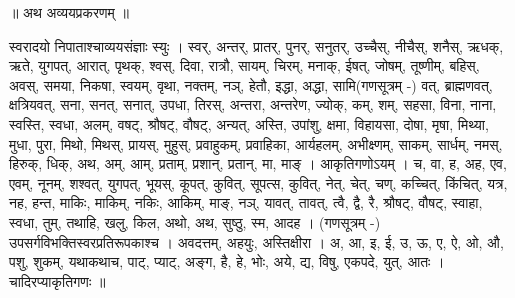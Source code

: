 ॥ अथ अव्ययप्रकरणम्‌ ॥

स्वरादयो निपाताश्चाव्ययसंज्ञाः स्युः । स्वर्, अन्तर्, प्रातर्, पुनर्,
सनुतर्, उच्चैस्, नीचैस्, शनैस्, ऋधक्, ऋते, युगपत्, आरात्, पृथक्, श्वस्,
दिवा, रात्रौ, सायम्, चिरम्, मनाक्, ईषत्, जोषम्, तूष्णीम्, बहिस्, अवस्,
समया, निकषा, स्वयम्, वृथा, नक्तम्, नञ्, हेतौ, इद्धा, अद्धा,
सामि(गणसूत्रम् -) वत्, ब्राह्मणवत्, क्षत्रियवत्, सना, सनत्, सनात्, उपधा,
तिरस्, अन्तरा, अन्तरेण, ज्योक्, कम्, शम्, सहसा, विना, नाना, स्वस्ति,
स्वधा, अलम्, वषट्, श्रौषट्, वौषट्, अन्यत्, अस्ति, उपांशु, क्षमा,
विहायसा, दोषा, मृषा, मिथ्या, मुधा, पुरा, मिथो, मिथस्, प्रायस्, मुहुस्,
प्रवाहुकम्, प्रवाहिका, आर्यहलम्, अभीक्ष्णम्, साकम्, सार्धम्, नमस्,
हिरुक्, धिक्, अथ, अम्, आम्, प्रताम्, प्रशान्, प्रतान्, मा, माङ् ।
आकृतिगणोऽयम् । च, वा, ह, अह, एव, एवम्, नूनम्, शश्वत्, युगपत्, भूयस्,
कूपत्, कुवित्, सूपत्स, कुवित्, नेत्, चेत्, चण्, कच्चित्, किंचित्, यत्र,
नह, हन्त, माकिः, माकिम्, नकिः, आकिम्, माङ्, नञ्, यावत्, तावत्, त्वै,
द्वै, रै, श्रौषट्, वौषट्, स्वाहा, स्वधा, तुम्, तथाहि, खलु, किल, अथो, अथ,
सुष्ठु, स्म, आदह । (गणसूत्रम् -) उपसर्गविभक्तिस्वरप्रतिरूपकाश्च ।
अवदत्तम्, अहयुः, अस्तिक्षीरा । अ, आ, इ, ई, उ, ऊ, ए, ऐ, ओ, औ, पशु, शुकम्,
यथाकथाच, पाट्, प्याट्, अङ्ग, है, हे, भोः, अये, द्य, विषु, एकपदे, युत्,
आतः । चादिरप्याकृतिगणः ॥

